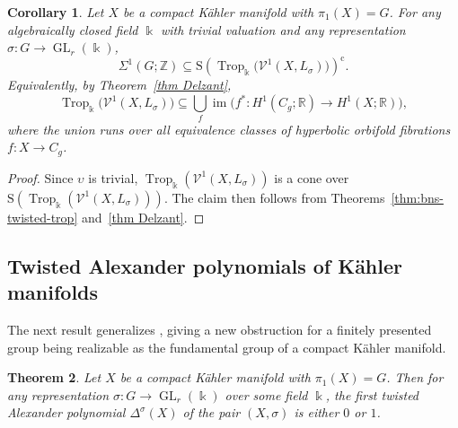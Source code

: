 \documentclass[11pt]{amsart}
\newtheorem{theorem}{Theorem}[section]
\newtheorem{corollary}[theorem]{Corollary}
\theoremstyle{definition}
\newcommand{\Z}{\mathbb{Z}}
\newcommand{\R}{\mathbb{R}}
\renewcommand{\k}{\Bbbk}
\newcommand{\VV}{\mathcal{V}}
\newcommand{\rS}{\mathrm{S}}
\DeclareMathOperator{\im}{im}
\DeclareMathOperator{\GL}{GL}
\DeclareMathOperator{\Trop}{Trop}
\newcommand{\compl}{\mathrm{c}}
\begin{document}
\begin{corollary}
\label{cor:bns-kahler}
Let $X$ be a compact K\"{a}hler manifold with $\pi_1(X)=G$. 
For any algebraically closed field $\k$ with trivial valuation 
and any representation $\sigma\colon G\to \GL_r(\k)$,
\[
\Sigma^1(G;\Z) \subseteq 
\rS\!\left(\Trop_\k\bigl(\VV^1(X,L_\sigma)\bigr)\right)^{\!\compl}.
\]
Equivalently, by Theorem~\ref{thm Delzant}, 
\[
\Trop_\k\bigl(\VV^1(X,L_\sigma)\bigr) \subseteq 
\bigcup_f \im\bigl(f^{*}\colon H^1(C_g;\R)\longrightarrow H^1(X;\R)\bigr),
\]
where the union runs over all equivalence classes of 
hyperbolic orbifold fibrations $f\colon X\to C_g$.
\end{corollary}

\begin{proof}
Since $\upsilon$ is trivial, $\Trop_\k(\VV^1(X,L_\sigma))$ is a cone over 
$\rS(\Trop_\k(\VV^1(X,L_\sigma)))$. The claim then follows from 
Theorems~\ref{thm:bns-twisted-trop} and~\ref{thm Delzant}.
\end{proof}

\subsection{Twisted Alexander polynomials of K\"{a}hler manifolds}
\label{subsec:twist-alex-kahler}

The next result generalizes \cite[Thm. 4.3(3)]{DPS-imrn}, 
giving a new obstruction for a finitely presented group being realizable 
as the fundamental group of a compact K\"{a}hler manifold. 

\begin{theorem}
\label{thm:alexpoly-kahler}
Let $X$ be a compact K\"ahler manifold with $\pi_1(X)=G$. 
Then for any representation $\sigma\colon G\to \GL_r(\k)$ over some field $\k$, 
the first twisted Alexander polynomial $\Delta^\sigma(X)$ of the pair $(X,\sigma)$ 
is either $0$ or $1$.
\end{theorem}
\end{document}
